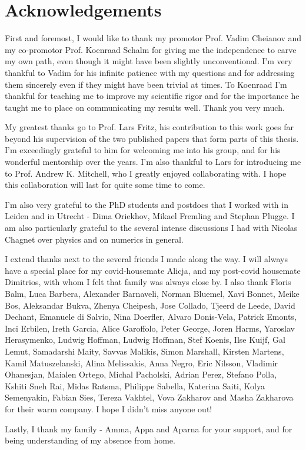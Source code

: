 \newpage
\thispagestyle{empty}

\chapter*{Acknowledgements}
\label{Acknowledgements}

First and foremost, I would like to thank my promotor Prof. Vadim Cheianov and my co-promotor Prof. Koenraad Schalm for giving me the independence to carve my own path, even though it might have been slightly unconventional. I'm very thankful to Vadim for his infinite patience with my questions and for addressing them sincerely even if they might have been trivial at times. To Koenraad I'm thankful for teaching me to improve my scientific rigor and for the importance he taught me to place on communicating my results well. Thank you very much. 
\par
My greatest thanks go to Prof. Lars Fritz, his contribution to this work goes far beyond his supervision of the two published papers that form parts of this thesis. I'm exceedingly grateful to him for welcoming me into his group, and for his wonderful mentorship over the years. I'm also thankful to Lars for introducing me to Prof. Andrew K. Mitchell, who I greatly enjoyed collaborating with. I hope this collaboration will last for quite some time to come. 
\par
I'm also very grateful to the PhD students and postdocs that I worked with in Leiden and in Utrecht - Dima Oriekhov, Mikael Fremling and Stephan Plugge. I am also particularly grateful to the several intense discussions I had with Nicolas Chagnet over physics and on numerics in general. 
\par
I extend thanks next to the several friends I made along the way. I will always have a special place for my covid-housemate Alicja, and my post-covid housemate Dimitrios, with whom I felt that family was always close by. I also thank Floris Balm, Luca Barbera, Alexander Barnaveli, Norman Bluemel, Xavi Bonnet, Meike Bos, Aleksandar Bukva, Zhenya Cheipesh, Jose Collado, Tjeerd de Leede, David Dechant, Emanuele di Salvio, Nina Doerfler, Alvaro Donis-Vela, Patrick Emonts, Inci Erbilen, Ireth Garcia, Alice Garoffolo, Peter George, Joren Harms, Yaroslav Herasymenko, Ludwig Hoffman, Ludwig Hoffman, Stef Koenis, Ilse Kuijf, Gal Lemut, Samadarshi Maity, Savvas Malikis, Simon Marshall, Kirsten Martens, Kamil Matuszelanski, Alina Melissakis, Anna Negro, Eric Nilsson, Vladimir Ohanesjan, Maialen Ortego, Michal Pacholski, Adrian Perez, Stefano Polla, Kshiti Sneh Rai, Midas Ratsma, Philippe Sabella, Katerina Saiti, Kolya Semenyakin, Fabian Sies, Tereza Vakhtel, Vova Zakharov and Masha Zakharova for their  warm company. I hope I didn't miss anyone out! 
\par
Lastly, I thank my family - Amma, Appa and Aparna for your support, and for being understanding of my absence from home. 
\newpage
\thispagestyle{empty}